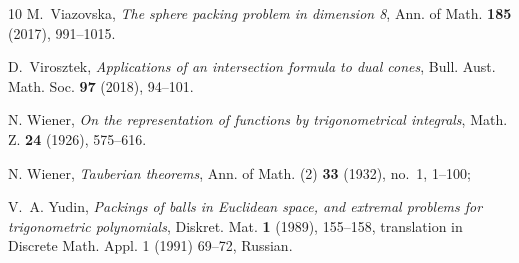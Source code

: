 \documentclass[[a4paper,english,12pt]{amsart}
\theoremstyle{plain}
\theoremstyle{remark}
\begin{document}
\begin{thebibliography}{10}
M.~Viazovska, \emph{The sphere packing problem in dimension 8}, Ann. of Math.
  \textbf{185} (2017), 991--1015.

D.~Virosztek, \emph{Applications of an intersection formula to dual cones},
  Bull. Aust. Math. Soc. \textbf{97} (2018), 94--101.

N.{} Wiener, \emph{On the representation of functions by trigonometrical integrals}, Math. Z. \textbf{24} (1926), 575--616.

N.{} Wiener, \emph{Tauberian theorems}, Ann. of Math. (2) \textbf{33} (1932), no.~1, 1--100;


V.~A. Yudin, \emph{Packings of balls in {E}uclidean space, and extremal
  problems for trigonometric polynomials}, Diskret. Mat. \textbf{1} (1989),
  155--158, translation in Discrete Math. Appl. 1 (1991) 69--72, Russian.

\end{thebibliography}
\end{document}
